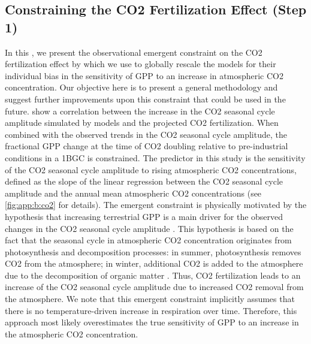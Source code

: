 \subsection{Constraining the \texorpdfstring{\acs{CO2}}{} Fertilization
  Effect (Step 1)}
\label{subsec:06:step_1}

In this , we present the observational emergent
constraint on the \ac{CO2} fertilization effect by \textcite{Wenzel2016} which
we use to globally rescale the models for their individual bias in the
sensitivity of \ac{GPP} to an increase in atmospheric \ac{CO2} concentration.
Our objective here is to present a general methodology and suggest further
improvements upon this constraint that could be used in the future.
\Textcite{Wenzel2016} show a correlation between the increase in the \ac{CO2}
seasonal cycle amplitude simulated by models and the projected \ac{CO2}
fertilization. When combined with the observed trends in the \ac{CO2} seasonal
cycle amplitude, the fractional \ac{GPP} change at the time of \ac{CO2}
doubling relative to pre-industrial conditions in a \ac{1BGC} is constrained.
The predictor in this study is the sensitivity of the \ac{CO2} seasonal cycle
amplitude to rising atmospheric \ac{CO2} concentrations, defined as the slope
of the linear regression between the \ac{CO2} seasonal cycle amplitude and the
annual mean atmospheric \ac{CO2} concentrations (see \cref{fig:app:b:co2} for
details). The emergent constraint is physically motivated by the hypothesis
that increasing terrestrial \ac{GPP} is a main driver for the observed changes
in the \ac{CO2} seasonal cycle amplitude \autocite{Gray2014, Keeling1996,
  Zhao2014}. This hypothesis is based on the fact that the seasonal cycle in
atmospheric \ac{CO2} concentration originates from photosynthesis and
decomposition processes: in summer, photosynthesis removes \ac{CO2} from the
atmosphere; in winter, additional \ac{CO2} is added to the atmosphere due to
the decomposition of organic matter \autocite{Keeling1995}. Thus, \ac{CO2}
fertilization leads to an increase of the \acs{CO2} seasonal cycle amplitude
due to increased \acs{CO2} removal from the atmosphere. We note that this
emergent constraint implicitly assumes that there is no temperature-driven
increase in respiration over time. Therefore, this approach most likely
overestimates the true sensitivity of \ac{GPP} to an increase in the
atmospheric \ac{CO2} concentration.

